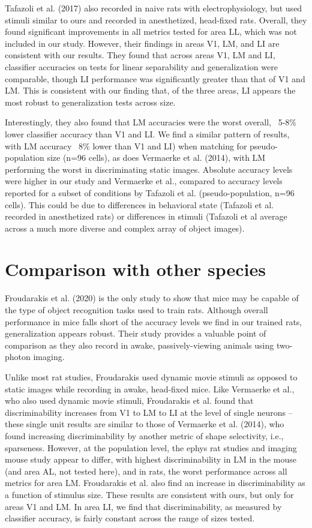 Tafazoli et al. (2017) also recorded in naive rats with electrophysiology, but used stimuli similar to ours and recorded in anesthetized, head-fixed rats. Overall, they found significant improvements in all metrics tested for area LL, which was not included in our study. However, their findings in areas V1, LM, and LI are consistent with our results. They found that across areas V1, LM and LI, classifier accuracies on tests for linear separability and generalization were comparable, though LI performance was significantly greater than that of V1 and LM. This is consistent with our finding that, of the three areas, LI appears the most robust to generalization tests across size.

Interestingly, they also found that LM accuracies were the worst overall, ~5-8\% lower classifier accuracy than V1 and LI. We find a similar pattern of results, with LM accuracy ~8\% lower than V1 and LI) when matching for pseudo-population size (n=96 cells), as does Vermaerke et al. (2014), with LM performing the worst in discriminating static images. Absolute accuracy levels were higher in our study and Vermaerke et al., compared to accuracy levels reported for a subset of conditions by Tafazoli et al. (pseudo-population, n=96 cells). This could be due to differences in behavioral state (Tafazoli et al. recorded in anesthetized rats) or differences in stimuli (Tafazoli et al average across a much more diverse and complex array of object images). 

\section{Comparison with other species}
Froudarakis et al. (2020) is the only study to show that mice may be capable of the type of object recognition tasks used to train rats. Although overall performance in mice falls short of the accuracy levels we find in our trained rats, generalization appears robust. Their study provides a valuable point of comparison as they also record in awake, passively-viewing animals using two-photon imaging.

Unlike most rat studies, Froudarakis used dynamic movie stimuli as opposed to static images while recording in awake, head-fixed mice. Like Vermaerke et al., who also used dynamic movie stimuli, Froudarakis et al. found that discriminability increases from V1 to LM to LI at the level of single neurons -- these single unit results are similar to those of Vermaerke et al. (2014), who found increasing discriminability by another metric of shape selectivity, i.e., sparseness. However, at the population level, the ephys rat studies and imaging mouse study appear to differ, with highest discriminability in LM in the mouse (and area AL, not tested here), and in rats, the worst performance across all metrics for area LM. Froudarakis et al. also find an increase in discriminability as a function of stimulus size. These results are consistent with ours, but only for areas V1 and LM. In area LI, we find that discriminability, as measured by classifier accuracy, is fairly constant across the range of sizes tested. 

